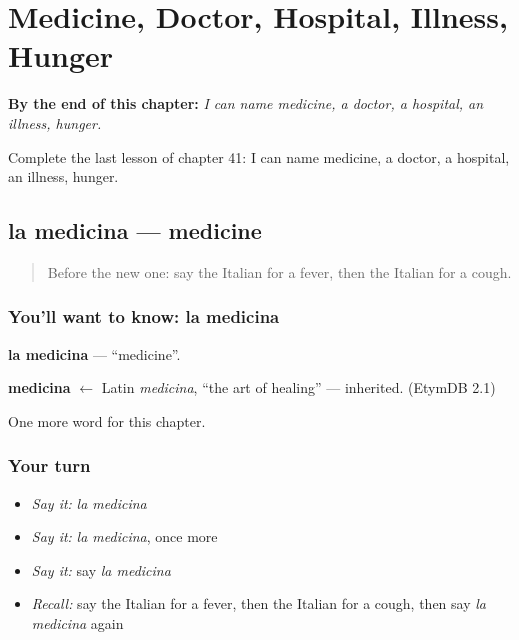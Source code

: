 
\chapter{Medicine, Doctor, Hospital, Illness, Hunger}
\label{ch:it-medicine-doctor-hospital-illness-hunger}

\begin{chapteropening}
\textbf{By the end of this chapter:} \emph{I can name medicine, a doctor, a hospital, an illness, hunger.}

Complete the last lesson of chapter 41: I can name medicine, a doctor, a hospital, an illness, hunger.
\end{chapteropening}

\section[la medicina]{la medicina — medicine}

\label{lesson:IT-C41-medicina}



\begin{quote}
Before the new one: say the Italian for a fever, then the Italian for a cough.
\end{quote}

\subsection*{You'll want to know: la medicina}
\textbf{la medicina} — \textquotedblleft{}medicine\textquotedblright{}.

\begin{cousinweb}
\textbf{medicina} $\leftarrow$ Latin \emph{medicina}, \textquotedblleft{}the art of healing\textquotedblright{} — inherited. (EtymDB 2.1)
\end{cousinweb}

\begin{grammarlens}[title={What you've built}]
One more word for this chapter.
\end{grammarlens}

\subsection*{Your turn}
\begin{itemize}
\raggedright
  \item \emph{Say it:} \emph{la medicina}
  \item \emph{Say it:} \emph{la medicina}, once more
  \item \emph{Say it:} say \emph{la medicina}
  \item \emph{Recall:} say the Italian for a fever, then the Italian for a cough, then say \emph{la medicina} again
\end{itemize}

